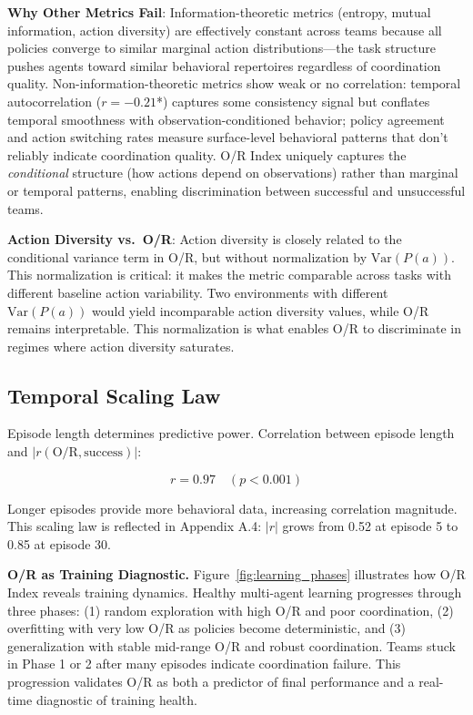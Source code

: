 \documentclass[twoside]{article}
\theoremstyle{remark}
\begin{document}
\textbf{Why Other Metrics Fail}: Information-theoretic metrics (entropy, mutual information, action diversity) are effectively constant across teams because all policies converge to similar marginal action distributions—the task structure pushes agents toward similar behavioral repertoires regardless of coordination quality. Non-information-theoretic metrics show weak or no correlation: temporal autocorrelation ($r = -0.21$*) captures some consistency signal but conflates temporal smoothness with observation-conditioned behavior; policy agreement and action switching rates measure surface-level behavioral patterns that don't reliably indicate coordination quality. O/R Index uniquely captures the \textit{conditional} structure (how actions depend on observations) rather than marginal or temporal patterns, enabling discrimination between successful and unsuccessful teams.

\textbf{Action Diversity vs.\ O/R}: Action diversity is closely related to the conditional variance term in O/R, but without normalization by $\text{Var}(P(a))$. This normalization is critical: it makes the metric comparable across tasks with different baseline action variability. Two environments with different $\text{Var}(P(a))$ would yield incomparable action diversity values, while O/R remains interpretable. This normalization is what enables O/R to discriminate in regimes where action diversity saturates.



\subsection{Temporal Scaling Law}
\label{subsec:temporal}

Episode length determines predictive power. Correlation between episode length and $|r(\text{O/R}, \text{success})|$:

\begin{equation}
r = 0.97 \quad (p < 0.001)
\end{equation}

Longer episodes provide more behavioral data, increasing correlation magnitude. This scaling law is reflected in Appendix A.4: $|r|$ grows from 0.52 at episode 5 to 0.85 at episode 30.



\textbf{O/R as Training Diagnostic.} Figure~\ref{fig:learning_phases} illustrates how O/R Index reveals training dynamics. Healthy multi-agent learning progresses through three phases: (1) random exploration with high O/R and poor coordination, (2) overfitting with very low O/R as policies become deterministic, and (3) generalization with stable mid-range O/R and robust coordination. Teams stuck in Phase 1 or 2 after many episodes indicate coordination failure. This progression validates O/R as both a predictor of final performance and a real-time diagnostic of training health.
\end{document}
